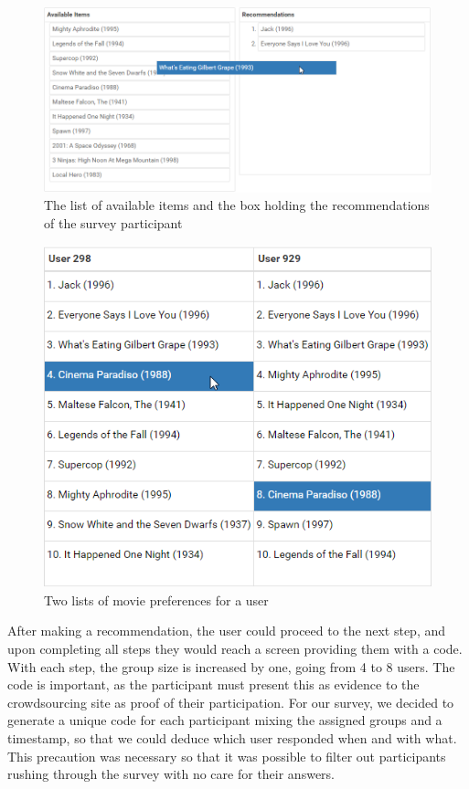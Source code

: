 \begin{figure}
	\includegraphics[scale=0.35]{graphics/recbox.png}
	\caption{The list of available items and the box holding the recommendations of the survey participant}
	\label{fig:appendix_recbox}
\end{figure}

\begin{figure}
	\includegraphics[scale=0.5]{graphics/users.png}
	\caption{Two lists of movie preferences for a user}
	\label{fig:appendix_userprefs}
\end{figure}

After making a recommendation, the user could proceed to the next step, and upon completing all steps they would reach a screen providing them with a code. With each step, the group size is increased by one, going from 4 to 8 users. The code is important, as the participant must present this as evidence to the crowdsourcing site as proof of their participation. For our survey, we decided to generate a unique code for each participant mixing the assigned groups and a timestamp, so that we could deduce which user responded when and with what. This precaution was necessary so that it was possible to filter out participants rushing through the survey with no care for their answers.

